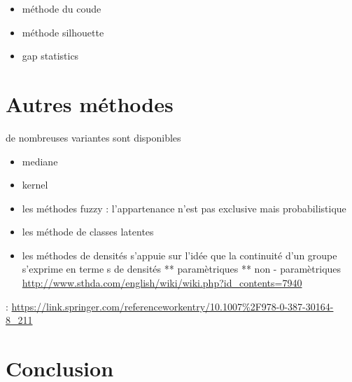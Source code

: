\documentclass[
]{book}
\providecommand{\tightlist}{%
  \setlength{\itemsep}{0pt}\setlength{\parskip}{0pt}}
\begin{document}
\begin{itemize}
\tightlist
\item
  méthode du coude
\item
  méthode silhouette
\item
  gap statistics
\end{itemize}

\hypertarget{autres-muxe9thodes}{%
\section{Autres méthodes}\label{autres-muxe9thodes}}

de nombreuses variantes sont disponibles

\begin{itemize}
\tightlist
\item
  mediane
\item
  kernel
\item
  les méthodes fuzzy : l'appartenance n'est pas exclusive mais probabilistique
\item
  les méthode de classes latentes
\item
  les méthodes de densités s'appuie sur l'idée que la continuité d'un groupe s'exprime en terme s de densités
  ** paramètriques
  ** non - paramètriques \url{http://www.sthda.com/english/wiki/wiki.php?id_contents=7940}
\end{itemize}

: \url{https://link.springer.com/referenceworkentry/10.1007\%2F978-0-387-30164-8_211}

\hypertarget{conclusion}{%
\section{Conclusion}\label{conclusion}}

  
\end{document}
